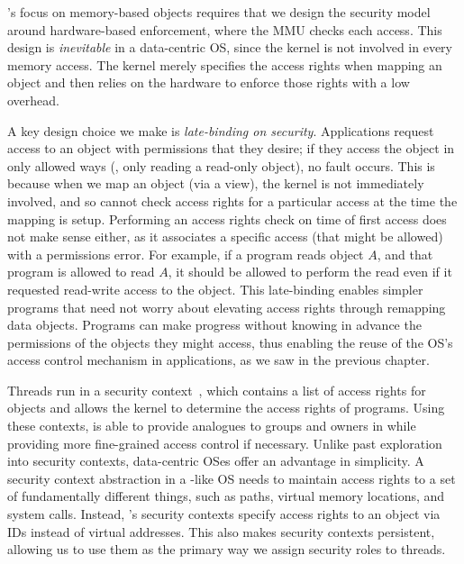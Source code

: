 \Twizzler's focus on memory-based objects requires that we design the security model around
hardware-based enforcement, where the MMU checks
each access. This design is \emph{inevitable} in a data-centric OS, since the
kernel is not involved in every memory access. The kernel merely specifies the access rights when
mapping an object and then relies on the hardware to enforce those rights with a low overhead.

A key design choice we make is \emph{late-binding on security}. Applications
request access to an object with permissions that they desire;
if they access the object in only allowed ways (\eg, only reading a read-only
object), no fault occurs.
This is because when we map an object (via a view), the kernel is not immediately involved, and so
cannot check access rights for a particular access at the time the mapping is setup. Performing an access rights check on
time of first access does not make sense either, as it associates a specific access (that
might be allowed) with a permissions error. For example, if a program reads object $A$, and that program is
allowed to read $A$, it should be allowed to perform the read even if it requested read-write access
to the object.
This late-binding enables simpler programs that need not worry about
elevating access rights through remapping data objects. Programs can make progress without
knowing in advance the permissions of the objects they might access, thus enabling the reuse of the
OS's access control mechanism in applications, as we saw in the previous chapter.

Threads run in a security context~\cite{lwc,bittau:nsdi08,elhajj:asplos16}, which
contains a list of access rights for objects and allows the kernel to determine the access rights of
programs. Using these contexts, \Twizzler is able to provide
analogues to groups and owners in \unix while providing more fine-grained access control if
necessary. Unlike past exploration into security contexts, data-centric OSes offer an
advantage in simplicity. A security context abstraction in a \unix-like OS needs to
maintain access rights to a set of fundamentally different things, such as paths, virtual memory
locations, and system calls. Instead, \Twizzler's security contexts specify access rights to an object
via IDs instead of virtual addresses.
This also makes security contexts persistent, allowing us to use them as
the primary way we assign security roles to threads.


